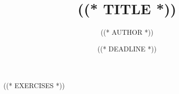 \documentclass[10pt,a4paper]{article}
\title{((* TITLE *))}
\date{((* DEADLINE *))}
\author{((* AUTHOR *))}
\begin{document}
\maketitle
\newpage

((* EXERCISES *))
\end{document}
